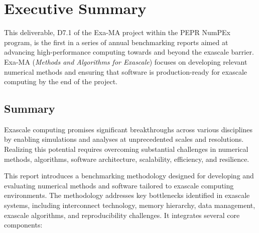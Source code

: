 
\clearpage
\section*{Executive Summary}
\label{sec:summary}

This deliverable, D7.1 of the Exa-MA project within the PEPR NumPEx program, is the first in a series of annual benchmarking reports aimed at advancing high-performance computing towards and beyond the exascale barrier. Exa-MA (\emph{Methods and Algorithms for Exascale}) focuses on developing relevant numerical methods and ensuring that software is production-ready for exascale computing by the end of the project.

\subsection*{Summary}

Exascale computing promises significant breakthroughs across various disciplines by enabling simulations and analyses at unprecedented scales and resolutions. Realizing this potential requires overcoming substantial challenges in numerical methods, algorithms, software architecture, scalability, efficiency, and resilience.

This report introduces a  benchmarking methodology designed for developing and evaluating numerical methods and software tailored to exascale computing environments. The methodology addresses key bottlenecks identified in exascale systems, including interconnect technology, memory hierarchy, data management, exascale algorithms, and reproducibility challenges. 
It integrates several core components:

